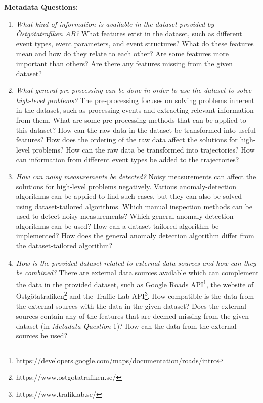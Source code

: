 \begin{description}
  \item \textbf{Metadata Questions:}
  \begin{enumerate}
    \item \textit{What kind of information is available in the dataset provided by Östgötatrafiken AB?} \newline
    What features exist in the dataset, such as different event types, event parameters, and event structures?
    What do these features mean and how do they relate to each other?
    Are some features more important than others?
    Are there any features missing from the given dataset?
    \item \textit{What general pre-processing can be done in order to use the dataset to solve high-level problems?} \newline
    The pre-processing focuses on solving problems inherent in the dataset, such as processing events and extracting relevant information from them.
    What are some pre-processing methods that can be applied to this dataset?
    How can the raw data in the dataset be transformed into useful features?
    How does the ordering of the raw data affect the solutions for high-level problems?
    How can the raw data be transformed into trajectories?
    How can information from different event types be added to the trajectories?
    \item \textit{How can noisy measurements be detected?} \newline
    Noisy measurements can affect the solutions for high-level problems negatively.
    Various anomaly-detection algorithms can be applied to find such cases, but they can also be solved using dataset-tailored algorithms.
    Which manual inspection methods can be used to detect noisy measurements?
    Which general anomaly detection algorithms can be used?
    How can a dataset-tailored algorithm be implemented?
    How does the general anomaly detection algorithm differ from the dataset-tailored algorithm?
    \item \textit{How is the provided dataset related to external data sources and how can they be combined?} \newline
    There are external data sources available which can complement the data in the provided dataset, such as Google Roads API\footnote{https://developers.google.com/maps/documentation/roads/intro}, the website of Östgötatrafiken\footnote{https://www.ostgotatrafiken.se/} and the Traffic Lab API\footnote{https://www.trafiklab.se/}.
    How compatible is the data from the external sources with the data in the given dataset?
    Does the external sources contain any of the features that are deemed missing from the given dataset (in \textit{Metadata Question} 1)? 
    How can the data from the external sources be used?
  \end{enumerate}


\end{description}
